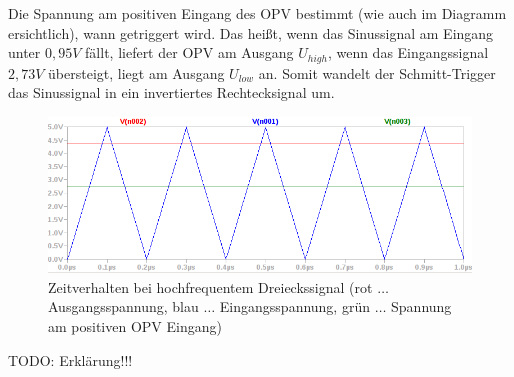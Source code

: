 \documentclass[12pt,a4paper,titlepage]{article}
\begin{document}
\noindent Die Spannung am positiven Eingang des OPV bestimmt (wie auch im Diagramm ersichtlich), wann getriggert wird. Das heißt, wenn das Sinussignal am Eingang unter $0,95V$ f\"allt, liefert der OPV am Ausgang $U_{high}$, wenn das Eingangssignal $2,73V$ \"ubersteigt, liegt am Ausgang $U_{low}$ an. Somit wandelt der Schmitt-Trigger das Sinussignal in ein invertiertes Rechtecksignal um.

\begin{figure}[H]
  \centering
  \includegraphics[width=150mm]{schmitt_transient2.png}
  \caption{Zeitverhalten bei hochfrequentem Dreieckssignal (rot $\hdots$ Ausgangsspannung, blau $\hdots$ Eingangsspannung, gr\"un $\hdots$ Spannung am positiven OPV Eingang)}
\end{figure}

\noindent TODO: Erkl\"arung!!!
\end{document}
